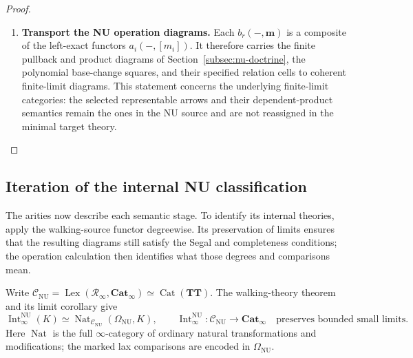 \documentclass[oneside]{article}
\theoremstyle{plain}
\theoremstyle{definition}
\theoremstyle{remark}
\newcommand{\CNU}{\mathcal C_{\mathrm{NU}}}
\newcommand{\Cat}{\mathbf{Cat}_{\infty}}
\newcommand{\Int}{\operatorname{Int}}
\newcommand{\Lex}{\operatorname{Lex}}
\newcommand{\NU}{\mathrm{NU}}
\newcommand{\Nat}{\operatorname{Nat}}
\newcommand{\RNU}{\mathcal R_{\infty}}
\newcommand{\TT}{\mathbf{TT}}
\begin{document}
\begin{proof}
\begin{enumerate}
of $\mathbf E$ in the presentable category
$\operatorname{Cat}^r(\TT)$.  Mapping this colimit into every $X$
identifies it, by \eqref{eq:stratified-native-evaluation} and
completeness of $X(t)$, with the compact representing object at
coordinate $0$.  Yoneda identifies the colimit with that object.
Taking opposites consequently constructs the required particular
limit in $T_r$, without asserting arbitrary infinite limits there.
All comparisons are natural in the complete multisimplicial diagram,
which supplies their mixed coherence.
\item \textbf{Transport the NU operation diagrams.}
Each $b_r(-,\mathbf m)$ is a composite of the left-exact functors
$a_i(-,[m_i])$.  It therefore carries the finite pullback and
product diagrams of Section~\ref{subsec:nu-doctrine}, the polynomial
base-change squares, and their specified relation cells to coherent
finite-limit diagrams.  This statement concerns the underlying
finite-limit categories: the selected representable arrows and their
dependent-product semantics remain the ones in the NU source and are
not reassigned in the minimal target theory.\qedhere
\end{enumerate}
\end{proof}

\subsection{Iteration of the internal NU classification}
\label{subsec:stratified-internalization}

The arities now describe each semantic stage. To identify its internal
theories, apply the walking-source functor degreewise. Its preservation
of limits ensures that the resulting diagrams still satisfy the Segal
and completeness conditions; the operation calculation then identifies
what those degrees and comparisons mean.

Write $\CNU=\Lex(\RNU,\Cat)\simeq\operatorname{Cat}(\TT)$.
The walking-theory theorem and its limit corollary give
\begin{equation}\label{eq:stratified-internalization-base}
 \Int^{\NU}_\infty(K)
 \simeq\Nat_{\CNU}(\Omega_{\NU},K),
 \qquad
 \Int^{\NU}_\infty:\CNU\longrightarrow\Cat
 \quad\text{preserves bounded small limits}.
\end{equation}
Here $\Nat$ is the full $\infty$-category of ordinary natural
transformations and modifications; the marked lax comparisons are
encoded in $\Omega_{\NU}$.
\end{document}
